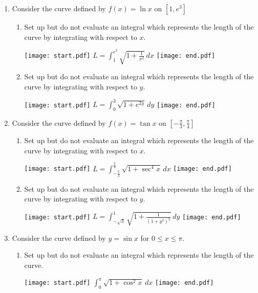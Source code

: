 \documentclass[12pt]{article}
\begin{document}
\begin{enumerate}
\item Consider the curve defined by $f(x)=\ln{x}$ on $\left[1,e^3\right]$

\begin{enumerate}

\item Set up but do not evaluate an integral which represents the length of the curve by integrating with respect to $x$.

\texttt{[image: start.pdf]}
{{$L=\int_1^{e^3} \sqrt{1+\frac{1}{x^2}} \,dx$}}
\texttt{[image: end.pdf]}


\item Set up but do not evaluate an integral which represents the length of the curve by integrating with respect to $y$.

\texttt{[image: start.pdf]}
{{$L=\int_0^3 \sqrt{1+e^{2y}} \,dy$}}
\texttt{[image: end.pdf]}


\end{enumerate}

\item Consider the curve defined by $f(x)=\tan{x}$ on $\left[-\frac{\pi}{3},\frac{\pi}{4}\right]$

\begin{enumerate}

\item Set up but do not evaluate an integral which represents the length of the curve by integrating with respect to $x$.

\texttt{[image: start.pdf]}
{{$L=\int_{-\frac{\pi}{3}}^{\frac{\pi}{4}} \sqrt{1+\sec^4{x}} \,dx$}}
\texttt{[image: end.pdf]}


\item Set up but do not evaluate an integral which represents the length of the curve by integrating with respect to $y$.

\texttt{[image: start.pdf]}
{{$L=\int_{-\sqrt{3}}^{1} \sqrt{1+\frac{1}{(1+y^2)^2}} \,dy$}}
\texttt{[image: end.pdf]}


\end{enumerate}

\item Consider the curve defined by $y=\sin{x}$ for $0 \leq x \leq \pi$.

\begin{enumerate}

\item Set up but do not evaluate an integral which represents the length of the curve.

\texttt{[image: start.pdf]}
{{$\int_0^\pi \sqrt{1+\cos^2{x}} \,dx$}}
\texttt{[image: end.pdf]}



\end{enumerate}
\end{enumerate}
\end{document}
